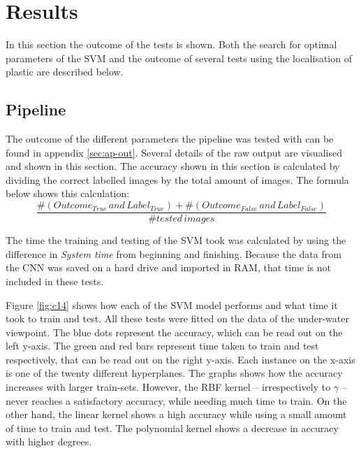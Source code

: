 \section{Results}
\label{sec:Results}
In this section the outcome of the tests is shown.
Both the search for optimal parameters of the SVM and the outcome of several tests using the localisation of plastic are described below.




\subsection{Pipeline}
\label{sec:Results-SVM}
The outcome of the different parameters the pipeline was tested with can be found in appendix \ref{sec:ap-out}.
Several details of the raw output are visualised and shown in this section.
The accuracy shown in this section is calculated by dividing the correct labelled images by the total amount of images. The formula below shows this calculation:
\[
\frac{\#(Outcome_{True}\,and\,Label_{True})+\#(Outcome_{False}\,and\,Label_{False})}{\#tested\,images}
\]

The time the training and testing of the SVM took was calculated by using the difference in \textit{System time} from beginning and finishing.
Because the data from the CNN was saved on a hard drive and imported in RAM, that time is not included in these tests.

Figure \ref{fig:c14} shows how each of the SVM model performs and what time it took to train and test.
All these tests were fitted on the data of the under-water viewpoint.
The blue dots represent the accuracy, which can be read out on the left y-axis.
The green and red bars represent time taken to train and test respectively, that can be read out on the right y-axis.
Each instance on the x-axis is one of the twenty different hyperplanes.
The graphs shows how the accuracy increases with larger train-sets. However, the RBF kernel -- irrespectively to $\gamma$ -- never reaches a satisfactory accuracy, while needing much time to train. On the other hand, the linear kernel shows a high accuracy while using a small amount of time to train and test. The polynomial kernel shows a decrease in accuracy with higher degrees.


